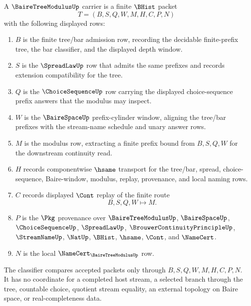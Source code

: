 \begin{definition}
\label{def:baire-tree-modulus-carrier}
A $\BaireTreeModulusUp$ carrier is a finite $\BHist$ packet
$$
T=(B,S,Q,W,M,H,C,P,N)
$$
with the following displayed rows:
\begin{enumerate}
\item $B$ is the finite tree/bar admission row, recording the decidable finite-prefix tree, the bar classifier, and the displayed depth window.
\item $S$ is the $\SpreadLawUp$ row that admits the same prefixes and records extension compatibility for the tree.
\item $Q$ is the $\ChoiceSequenceUp$ row carrying the displayed choice-sequence prefix answers that the modulus may inspect.
\item $W$ is the $\BaireSpaceUp$ prefix-cylinder window, aligning the tree/bar prefixes with the stream-name schedule and unary answer rows.
\item $M$ is the modulus row, extracting a finite prefix bound from $B,S,Q,W$ for the downstream continuity read.
\item $H$ records componentwise $\hsame$ transport for the tree/bar, spread, choice-sequence, Baire-window, modulus, replay, provenance, and local naming rows.
\item $C$ records displayed $\Cont$ replay of the finite route
$$
B,S,Q,W \longmapsto M .
$$
\item $P$ is the $\Pkg$ provenance over $\BaireTreeModulusUp$, $\BaireSpaceUp$, $\ChoiceSequenceUp$, $\SpreadLawUp$, $\BrouwerContinuityPrincipleUp$, $\StreamNameUp$, $\NatUp$, $\BHist$, $\hsame$, $\Cont$, and $\NameCert$.
\item $N$ is the local $\NameCert_{\BaireTreeModulusUp}$ row.
\end{enumerate}
The classifier compares accepted packets only through $B,S,Q,W,M,H,C,P,N$. It has no coordinate for a completed host stream, a selected branch through the tree, countable choice, quotient stream equality, an external topology on Baire space, or real-completeness data.
\end{definition}

